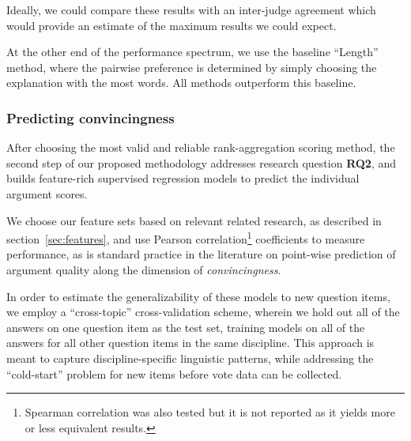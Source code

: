 \documentclass[notitlepage,12pt]{jedm}
\begin{document}
Ideally, we could compare these results with an inter-judge agreement which would
provide an estimate of the maximum results we could expect.  

At the other end of the performance spectrum, we use the baseline ``Length'' method, 
where the pairwise preference is determined by simply choosing the explanation with the most
words.  All methods outperform this baseline.

%
%
\subsubsection{Predicting convincingness}
After choosing the most valid and reliable rank-aggregation 
scoring method, the second step of our proposed methodology addresses
research question \textbf{RQ2}, and builds feature-rich supervised regression 
models to predict the individual argument scores.

We choose our feature sets based on relevant related research, as described in 
section~\ref{sec:features}, and use Pearson correlation\footnote{Spearman correlation was also tested but it is not reported as it yields more or less equivalent results.} 
coefficients to measure performance, as is standard practice in the literature 
on point-wise prediction of argument quality along the dimension of 
\textit{convincingness}. 
 
In order to estimate the generalizability of these models to new question 
items, we employ a ``cross-topic'' cross-validation scheme, wherein we hold out 
all of the answers on one question item as the test set, training models on all 
of the answers for all other question items in the same discipline.
This approach is meant to capture discipline-specific linguistic patterns, 
while addressing the ``cold-start'' problem for new items before vote data 
can be collected.
\end{document}
